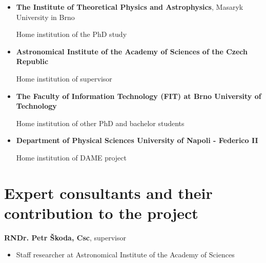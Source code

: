 \documentclass[a4paper,10pt,oneside,onecolumn]{article}
\begin{document}
\begin{itemize} \addtolength{\itemsep}{-0.5\baselineskip}

\item {\bf{The Institute of Theoretical Physics and Astrophysics}}, Masaryk
University in Brno 

Home institution of the PhD study

\item {\bf{Astronomical Institute of the Academy of Sciences of the Czech
    Republic}}

Home institution of supervisor

\item {\bf{The Faculty of Information Technology (FIT) at Brno University of Technology}}

Home institution of other PhD and bachelor students

\item {\bf{Department of Physical Sciences University of Napoli - Federico II}}

Home institution of DAME project

\end{itemize}






\section{Expert consultants and their contribution to the project}

\textbf{RNDr. Petr Škoda, Csc}, supervisor 
\begin{itemize}
\item Staff researcher at Astronomical Institute of the Academy of Sciences
\end{itemize}
\end{document}
